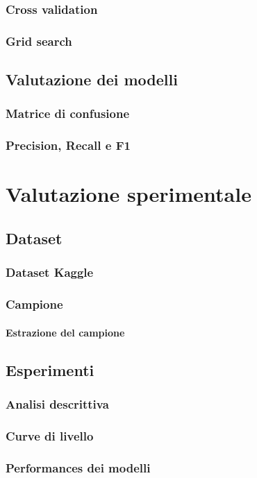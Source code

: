 \documentclass[12pt]{report}
\theoremstyle{definition}
\begin{document}
\subsection{Cross validation}
\subsection{Grid search}
\section{Valutazione dei modelli}
\subsection{Matrice di confusione}
\subsection{Precision, Recall e F1}

\chapter{Valutazione sperimentale}
\label{Capitolo 4}
\onehalfspacing
\section{Dataset}
\subsection{Dataset Kaggle}
\subsection{Campione}
\subsubsection{Estrazione del campione}
\section{Esperimenti}
\subsection{Analisi descrittiva}
\subsection{Curve di livello}
\subsection{Performances dei modelli}
\end{document}
